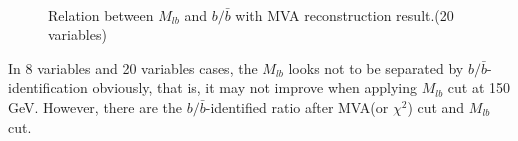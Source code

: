 		\begin{figure}[H]
		\centering
			\\
		\caption{Relation between $M_{lb}$ and $b/\bar{b}$ with MVA reconstruction result.(20 variables)}
		\label{EventSelReco:fig:a05_bbsep_eff}
		\end{figure}
		\FloatBarrier

		In 8 variables and 20 variables cases, the $M_{lb}$ looks not to be separated by $b/\bar{b}$-identification obviously, that is, it may not improve when applying $M_{lb}$ cut at 150 GeV. However, there are the $b/\bar{b}$-identified ratio after MVA(or $\chi^2$) cut and $M_{lb}$ cut.


